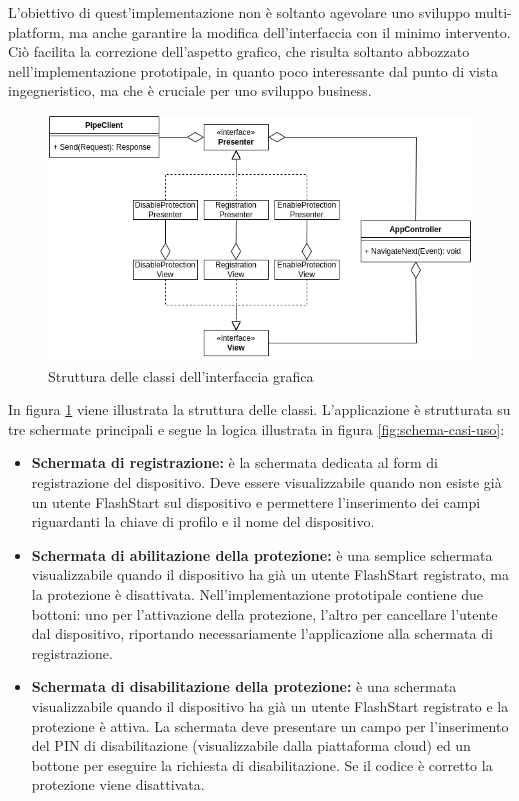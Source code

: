 \documentclass[12pt,a4paper,openright,twoside]{book}
\newcommand{\itemdef}[1]{\item \textbf{#1}}
\begin{document}
L'obiettivo di quest'implementazione non è soltanto agevolare uno sviluppo multi-platform, ma anche garantire la modifica dell'interfaccia con il minimo intervento.
Ciò facilita la correzione dell'aspetto grafico, che risulta soltanto abbozzato nell'implementazione prototipale, in quanto poco interessante dal punto di vista ingegneristico, ma che è cruciale per uno sviluppo business.
\begin{figure}[H]
	\centering
	\includegraphics[width=1.0\textwidth]{figures/mvp-classes.png}
	\caption{Struttura delle classi dell'interfaccia grafica}
	\label{fig:mvp-struttura-classi}
\end{figure}
In figura \ref{fig:mvp-struttura-classi} viene illustrata la struttura delle classi.
L'applicazione è strutturata su tre schermate principali e segue la logica illustrata in figura \ref{fig:schema-casi-uso}:
\begin{itemize}
	\itemdef{Schermata di registrazione:} è la schermata dedicata al form di registrazione del dispositivo.
	Deve essere visualizzabile quando non esiste già un utente FlashStart sul dispositivo e permettere l'inserimento dei campi riguardanti la chiave di profilo e il nome del dispositivo.
	
	\itemdef{Schermata di abilitazione della protezione:} è una semplice schermata visualizzabile quando il dispositivo ha già un utente FlashStart registrato, ma la protezione è disattivata.
	Nell'implementazione prototipale contiene due bottoni: uno per l'attivazione della protezione, l'altro per cancellare l'utente dal dispositivo, riportando necessariamente l'applicazione alla schermata di registrazione.
	
	\itemdef{Schermata di disabilitazione della protezione:} è una schermata visualizzabile quando il dispositivo ha già un utente FlashStart registrato e la protezione è attiva.
	La schermata deve presentare un campo per l'inserimento del PIN di disabilitazione (visualizzabile dalla piattaforma cloud) ed un bottone per eseguire la richiesta di disabilitazione.
	Se il codice è corretto la protezione viene disattivata.
\end{itemize}
\end{document}
